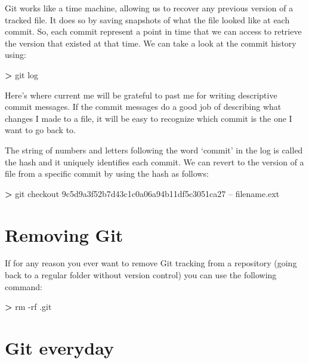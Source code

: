 \documentclass[
]{book}
\newenvironment{Shaded}{\begin{snugshade}}{\end{snugshade}}
\newcommand{\FunctionTok}[1]{\textcolor[rgb]{0.00,0.00,0.00}{#1}}
\newcommand{\NormalTok}[1]{#1}
\newcommand{\OperatorTok}[1]{\textcolor[rgb]{0.81,0.36,0.00}{\textbf{#1}}}
\begin{document}
Git works like a time machine, allowing us to recover any previous version of a tracked file. It does so by saving snapshots of what the file looked like at each commit. So, each commit represent a point in time that we can access to retrieve the version that existed at that time. We can take a look at the commit history using:

\begin{Shaded}
\begin{Highlighting}[]
\OperatorTok{>} \FunctionTok{git}\NormalTok{ log}
\end{Highlighting}
\end{Shaded}

Here's where current me will be grateful to past me for writing descriptive commit messages. If the commit messages do a good job of describing what changes I made to a file, it will be easy to recognize which commit is the one I want to go back to.

The string of numbers and letters following the word `commit' in the log is called the hash and it uniquely identifies each commit. We can revert to the version of a file from a specific commit by using the hash as follows:

\begin{Shaded}
\begin{Highlighting}[]
\OperatorTok{>} \FunctionTok{git}\NormalTok{ checkout 9c5d9a3f52b7d43c1c0a06a94b11df5c3051ca27 -- filename.ext}
\end{Highlighting}
\end{Shaded}

\hypertarget{removing-git}{%
\section{Removing Git}\label{removing-git}}

If for any reason you ever want to remove Git tracking from a repository (going back to a regular folder without version control) you can use the following command:

\begin{Shaded}
\begin{Highlighting}[]
\OperatorTok{>} \FunctionTok{rm}\NormalTok{ -rf .git}
\end{Highlighting}
\end{Shaded}

\hypertarget{git-everyday}{%
\section{Git everyday}\label{git-everyday}}
\end{document}
